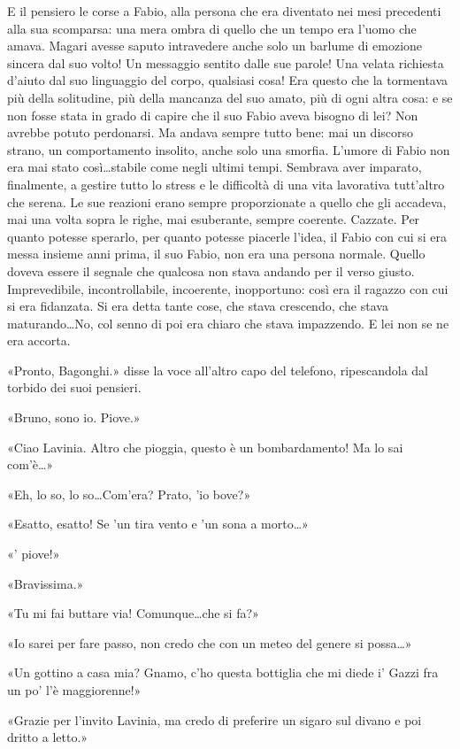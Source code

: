 E il pensiero le corse a Fabio, alla persona che era diventato nei mesi precedenti alla sua scomparsa: una mera ombra di quello che un tempo era l'uomo che amava. Magari avesse saputo intravedere anche solo un barlume di emozione sincera dal suo volto! Un messaggio sentito dalle sue parole! Una velata richiesta d'aiuto dal suo linguaggio del corpo, qualsiasi cosa! Era questo che la tormentava più della solitudine, più della mancanza del suo amato, più di ogni altra cosa: e se non fosse stata in grado di capire che il suo Fabio aveva bisogno di lei? Non avrebbe potuto perdonarsi. Ma andava sempre tutto bene: mai un discorso strano, un comportamento insolito, anche solo una smorfia. L'umore di Fabio non era mai stato così\ldots stabile come negli ultimi tempi. Sembrava aver imparato, finalmente, a gestire tutto lo stress e le difficoltà di una vita lavorativa tutt'altro che serena. Le sue reazioni erano sempre proporzionate a quello che gli accadeva, mai una volta sopra le righe, mai esuberante, sempre coerente. Cazzate. Per quanto potesse sperarlo, per quanto potesse piacerle l'idea, il Fabio con cui si era messa insieme anni prima, il suo Fabio, non era una persona normale. Quello doveva essere il segnale che qualcosa non stava andando per il verso giusto. Imprevedibile, incontrollabile, incoerente, inopportuno: così era il ragazzo con cui si era fidanzata. Si era detta tante cose, che stava crescendo, che stava maturando\ldots No, col senno di poi era chiaro che stava impazzendo. E lei non se ne era accorta.

«Pronto, Bagonghi.» disse la voce all'altro capo del telefono, ripescandola dal torbido dei suoi pensieri.

«Bruno, sono io. Piove.»

«Ciao Lavinia. Altro che pioggia, questo è un bombardamento! Ma lo sai com'è\ldots»

«Eh, lo so, lo so\ldots Com'era? Prato, 'io bove?»

«Esatto, esatto! Se 'un tira vento e 'un sona a morto\ldots»

«\ldotse' piove!»

«Bravissima.»

«Tu mi fai buttare via! Comunque\ldots che si fa?»

«Io sarei per fare passo, non credo che con un meteo del genere si possa\ldots»

«Un gottino a casa mia? Gnamo, c'ho questa bottiglia che mi diede i' Gazzi fra un po' l'è maggiorenne!»

«Grazie per l'invito Lavinia, ma credo di preferire un sigaro sul divano e poi dritto a letto.»

